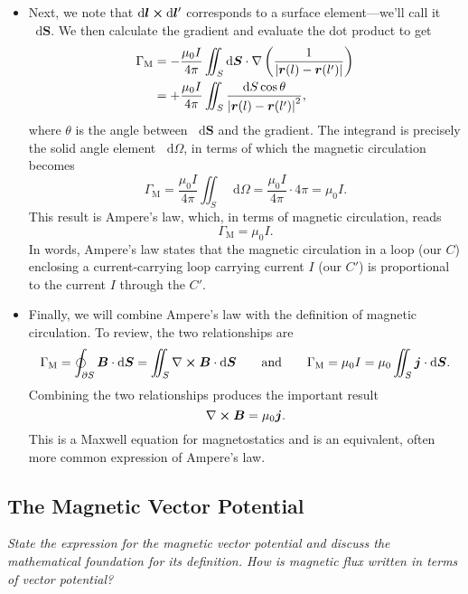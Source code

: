 \documentclass[11pt, a4paper]{article}
\newcommand{\diff}{\mathop{}\!\mathrm{d}} %
\newcommand{\eqtext}[1]{\qquad \text{#1} \qquad}
\renewcommand{\vec}[1]{\bm{#1}} %
\renewcommand{\r}{\vec{r}}
\newcommand{\B}{\vec{B}} %
\newcommand{\mm}{\mu_{0}}  %
\renewcommand{\j}{\vec{j}}  %
\renewcommand{\curl}{\nabla \cross}
\renewcommand{\grad}{\nabla}
\begin{document}
\begin{itemize}
    \item Next, we note that $ \diff \vec{l} \cross \diff \vec{l}' $ corresponds to a surface element---we'll call it $ \diff \vec{S} $. We then calculate the gradient and evaluate the dot product to get
	\begin{align*}
        \Gamma_{\text{M}} & =  - \frac{\mm I}{4\pi} \iint_{S} \diff \vec{S}\cdot \grad \left(\frac{1}{\abs{\r(l) - \r(l')}}\right) \\
        & = +  \frac{\mm I}{4\pi} \iint_{S}  \frac{\diff S \cos \theta}{\abs{\r(l) - \r(l')}^{2}},
	\end{align*}
	where $ \theta $ is the angle between $ \diff \vec{S} $ and the gradient. The integrand is precisely the solid angle element $ \diff \Omega $, in terms of which the magnetic circulation becomes
	\begin{equation*}
		\Gamma_{\text{M}} = \frac{\mm I}{4\pi} \iint_{S} \diff \Omega =  \frac{\mm I}{4\pi}  \cdot 4 \pi = \mm I.
	\end{equation*}
	This result is Ampere's law, which, in terms of magnetic circulation, reads
	\begin{equation*}
		\Gamma_{\text{M}} = \mm I.
	\end{equation*}
    In words, Ampere's law states that the magnetic circulation in a loop (our $ C $) enclosing a current-carrying loop carrying current $ I $ (our $ C' $) is proportional to the current $ I $ through the $ C' $.
	
	\item Finally, we will combine Ampere's law with the definition of magnetic circulation. To review, the two relationships are
	\begin{equation*}
		\Gamma_{\text{M}} = \oint_{\partial S} \B \cdot \diff \vec{S} = \iint_{S} \curl \B \cdot \diff \vec{S} \eqtext{and} \Gamma_{\text{M}} = \mm I = \mm \iint_{S} \j \cdot \diff \vec{S}.
	\end{equation*}
    Combining the two relationships produces the important result
	\begin{equation*}
		\curl \B = \mm \j.
	\end{equation*}
	This is a Maxwell equation for magnetostatics and is an equivalent, often more common expression of Ampere's law.
	
\end{itemize}

\subsection{The Magnetic Vector Potential} \label{ss:magnetic-potential}
\textit{State the expression for the magnetic vector potential and discuss the mathematical foundation for its definition. How is magnetic flux written in terms of vector potential?}
\end{document}
